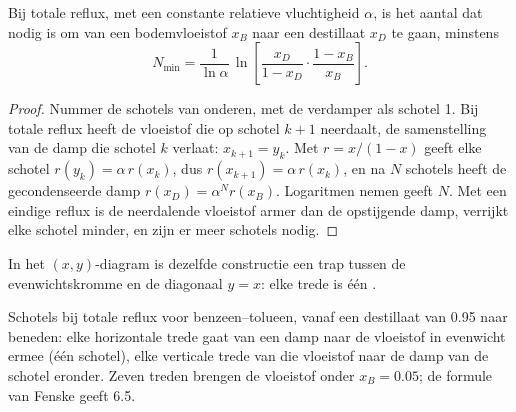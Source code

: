 \begin{proposition}[Fenske]\label{prop:b2:liquid-vapour-diagrams:fenske}
Bij totale reflux, met een constante relatieve vluchtigheid $\alpha$, is het aantal
 dat nodig is om van een bodemvloeistof $x_B$ naar een destillaat
$x_D$ te gaan, minstens
\[
  N_{\min} = \frac{1}{\ln\alpha}\,\ln\!\left[\frac{x_D}{1 - x_D}\cdot\frac{1 - x_B}{x_B}\right] .
\]
\end{proposition}

\begin{proof}
Nummer de schotels van onderen, met de verdamper als schotel 1. Bij totale reflux
heeft de vloeistof die op schotel $k + 1$ neerdaalt, de samenstelling van de damp
die schotel $k$ verlaat: $x_{k+1} = y_k$. Met $r = x/(1 - x)$ geeft elke schotel
$r(y_k) = \alpha\,r(x_k)$, dus $r(x_{k+1}) = \alpha\,r(x_k)$, en na $N$
schotels heeft de gecondenseerde damp $r(x_D) = \alpha^N r(x_B)$. Logaritmen nemen
geeft $N$. Met een eindige reflux is de neerdalende vloeistof armer dan de
opstijgende damp, verrijkt elke schotel minder, en zijn er meer schotels nodig.
\end{proof}

In het $(x, y)$-diagram is dezelfde constructie een trap tussen de
evenwichtskromme en de diagonaal $y = x$: elke trede is één .

\begin{omfigure}

{\small Schotels bij totale reflux voor benzeen--tolueen, vanaf een destillaat van
0.95 naar beneden: elke horizontale trede gaat van een damp naar de vloeistof in
evenwicht ermee (één schotel), elke verticale trede van die vloeistof naar de
damp van de schotel eronder. Zeven treden brengen de vloeistof onder $x_B = 0.05$;
de formule van Fenske geeft 6.5.}
\end{omfigure}

